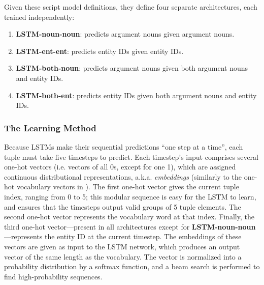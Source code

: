 Given these script model definitions, they define four separate architectures, each trained independently:

\begin{enumerate}
    \item \textbf{LSTM-noun-noun}: predicts argument nouns given argument nouns.
    \item \textbf{LSTM-ent-ent}: predicts entity IDs given entity IDs.
    \item \textbf{LSTM-both-noun}: predicts argument nouns given both argument nouns and entity IDs.
    \item \textbf{LSTM-both-ent}: predicts entity IDs given both argument nouns and entity IDs.
\end{enumerate}

\subsubsection{The Learning Method}
Because LSTMs make their sequential predictions ``one step at a time'', each tuple must take five timesteps to predict. Each timestep's input comprises several one-hot vectors (i.e. vectors of all 0s, except for one 1), which are assigned continuous distributional representations, a.k.a. \textit{embeddings} (similarly to the one-hot vocabulary vectors in \citep{mikolov2013}). The first one-hot vector gives the current tuple index, ranging from 0 to 5; this modular sequence is easy for the LSTM to learn, and ensures that the timesteps output valid groups of 5 tuple elements. The second one-hot vector represents the vocabulary word at that index. Finally, the third one-hot vector---present in all architectures except for \textbf{LSTM-noun-noun}---represents the entity ID at the current timestep. The embeddings of these vectors are given as input to the LSTM network, which produces an output vector of the same length as the vocabulary. The vector is normalized into a probability distribution by a softmax function, and a beam search is performed to find high-probability sequences.

